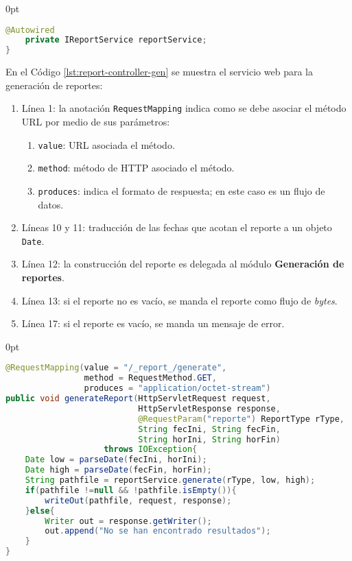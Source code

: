 \begin{enumerate}
\begin{adjustwidth}{\listingfixwidth}{0pt}
\begin{lstlisting}[language=Java, caption={Controlador para exponer servicios web de generación de reportes.}, captionpos=b, label={lst:report-controller}]
	@Autowired
	private IReportService reportService;
}
\end{lstlisting}
\end{adjustwidth}
	En el Código \ref{lst:report-controller-gen} se muestra el servicio web para la generación de reportes:
	\begin{enumerate}
		\item Línea 1: la anotación \texttt{RequestMapping} indica como se debe asociar el método URL por medio de sus parámetros:
		\begin{enumerate}
			\item \texttt{value}: URL asociada el método.
			\item \texttt{method}: método de HTTP asociado el método.
			\item \texttt{produces}: indica el formato de respuesta; en este caso es un flujo de datos.
		\end{enumerate}
		\item Líneas 10 y 11: traducción de las fechas que acotan el reporte a un objeto \texttt{Date}.
		\item Línea 12: la construcción del reporte es delegada al módulo \textbf{Generación de reportes}.
		\item Línea 13: si el reporte no es vacío, se manda el reporte como flujo de \textit{bytes}.
		\item Línea 17: si el reporte es vacío, se manda un mensaje de error.
	\end{enumerate}
\begin{adjustwidth}{\listingfixwidth}{0pt}
\begin{lstlisting}[language=Java, caption={Servicio web para generar un reporte.}, captionpos=b, label={lst:report-controller-gen}]
@RequestMapping(value = "/_report_/generate",
				method = RequestMethod.GET,
				produces = "application/octet-stream")
public void generateReport(HttpServletRequest request,
						   HttpServletResponse response,
						   @RequestParam("reporte") ReportType rType,
						   String fecIni, String fecFin,
						   String horIni, String horFin)
					throws IOException{
	Date low = parseDate(fecIni, horIni);
	Date high = parseDate(fecFin, horFin);
	String pathfile = reportService.generate(rType, low, high);
	if(pathfile !=null && !pathfile.isEmpty()){
		writeOut(pathfile, request, response);
	}else{
		Writer out = response.getWriter();
		out.append("No se han encontrado resultados");
	}
}
\end{lstlisting}
\end{adjustwidth}
\end{enumerate}
